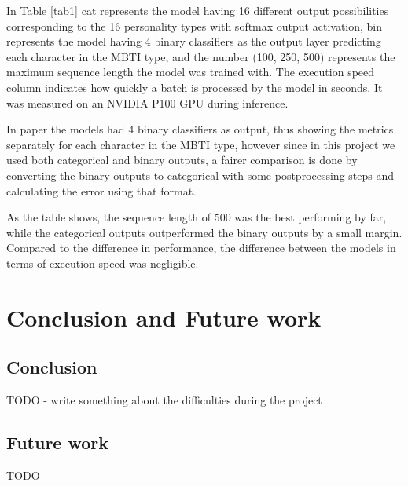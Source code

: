 \documentclass[runningheads]{llncs}
\begin{document}
In Table \ref{tab1} cat represents the model having 16 different output possibilities corresponding to the 16 personality types with softmax output activation, bin represents the model having 4 binary classifiers as the output layer predicting each character in the MBTI type, and the number (100, 250, 500) represents the maximum sequence length the model was trained with. The execution speed column indicates how quickly a batch is processed by the model in seconds. It was measured on an NVIDIA P100 GPU during inference. 

In paper \cite{MBTI_class} the models had 4 binary classifiers as output, thus showing the metrics separately for each character in the MBTI type, however since in this project we used both categorical and binary outputs, a fairer comparison is done by converting the binary outputs to categorical with some postprocessing steps and calculating the error using that format.

As the table shows, the sequence length of 500 was the best performing by far, while the categorical outputs outperformed the binary outputs by a small margin. Compared to the difference in performance, the difference between the models in terms of execution speed was negligible.

\section{Conclusion and Future work}

\subsection{Conclusion}

TODO - write something about the difficulties during the project

\subsection{Future work}

TODO



\end{document}
